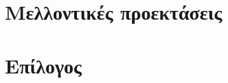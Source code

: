 
\section{Μελλοντικές προεκτάσεις}\label{sec:futureImprovements}


\section{Επίλογος}\label{sec:conclusion}
